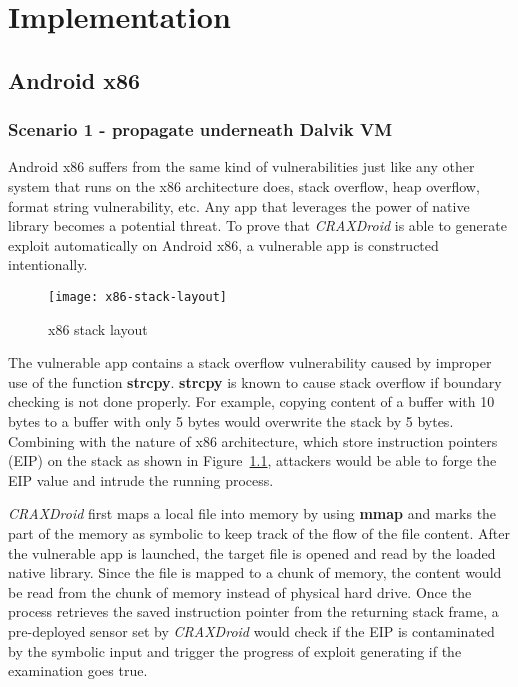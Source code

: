 \chapter{Implementation}

\section{Android x86}

\subsection{Scenario 1 - propagate underneath Dalvik VM}

Android x86 suffers from the same kind of vulnerabilities just like any other
system that runs on the x86 architecture does, stack overflow, heap overflow,
format string vulnerability, etc. Any app that leverages the power of native
library becomes a potential threat. To prove that \emph{CRAXDroid} is able to
generate exploit automatically on Android x86, a vulnerable app is constructed
intentionally.

\begin{figure}[!ht]
  \texttt{[image: x86-stack-layout]}
  \caption{x86 stack layout}
  \label{fig:x86-stack-layout}
\end{figure}

The vulnerable app contains a stack overflow vulnerability caused by improper
use of the function \textbf{strcpy}. \textbf{strcpy} is known to cause
stack overflow if boundary checking is not done properly. For example, copying
content of a buffer with 10 bytes to a buffer with only 5 bytes would overwrite
the stack by 5 bytes. Combining with the nature of x86 architecture, which
store instruction pointers (EIP) on the stack as shown in
Figure~\ref{fig:x86-stack-layout}, attackers would be able to forge the EIP
value and intrude the running process.

\emph{CRAXDroid} first maps a local file into memory by using \textbf{mmap} and
marks the part of the memory as symbolic to keep track of the flow of the file
content. After the vulnerable app is launched, the target file is opened and
read by the loaded native library. Since the file is mapped to a chunk of
memory, the content would be read from the chunk of memory instead of physical
hard drive. Once the process retrieves the saved instruction pointer from the
returning stack frame, a pre-deployed sensor set by \emph{CRAXDroid} would
check if the EIP is contaminated by the symbolic input and trigger the
progress of exploit generating if the examination goes true.

